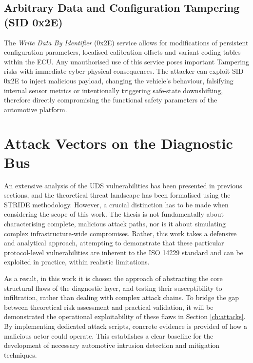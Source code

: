 \subsection{Arbitrary Data and Configuration Tampering (SID 0\textnormal{x}2E)}
The \textit{Write Data By Identifier} (0\textnormal{x}2E) service allows for modifications of persistent configuration parameters, localised calibration offsets and variant coding tables within the \gls{ECU}. Any unauthorised use of this service poses important Tampering risks with immediate cyber-physical consequences. The attacker can exploit \gls{SID} 0\textnormal{x}2E to inject malicious payload, changing the vehicle's behaviour, falsifying internal sensor metrics or intentionally triggering safe-state downshifting, therefore directly compromising the functional safety parameters of the automotive platform.
\section{Attack Vectors on the Diagnostic Bus}
\label{sec:attack_vectors_diagnostic_bus}

An extensive analysis of the UDS vulnerabilities has been presented in previous sections, and the theoretical threat landscape has been formalised using the STRIDE methodology. However, a crucial distinction has to be made when considering the scope of this work.
The thesis is not fundamentally about characterising complete, malicious attack paths, nor is it about simulating complex infrastructure-wide compromises. Rather, this work takes a defensive and analytical approach, attempting to demonstrate that these particular protocol-level vulnerabilities are inherent to the ISO 14229 standard and can be exploited in practice, within realistic limitations.

As a result, in this work it is chosen the approach of abstracting the core structural flaws of the diagnostic layer, and testing their susceptibility to infiltration, rather than dealing with complex attack chains. To bridge the gap between theoretical risk assessment and practical validation, it will be demonstrated the operational exploitability of these flaws in Section \ref{ch:attacks}. By implementing dedicated attack scripts, concrete evidence is provided of how a malicious actor could operate. This establishes a clear baseline for the development of necessary automotive intrusion detection and mitigation techniques.
